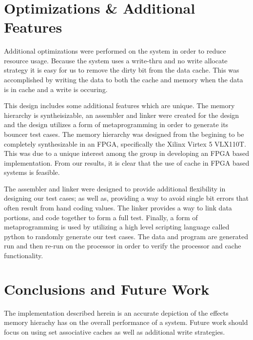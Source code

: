 \documentclass[11pt,letterpaper,]{article}
\begin{document}
\section{ Optimizations \& Additional Features }
\paragraph{}
Additional optimizations were performed on the system in order to reduce resource usage.  Because the system uses a write-thru and no write allocate strategy it is easy for us to remove the dirty bit from the data cache.  This was accomplished by writing the data to both the cache and memory when the data is in cache and a write is occuring.

This design includes some additional features which are unique.  The memory hierarchy is syntheisizable, an assembler and linker were created for the design and the design utilizes a form of metaprogramming in order to generate its bouncer test cases.  The memory hierarchy was designed from the begining to be completely synthesizable in an FPGA, specifically the Xilinx Virtex 5 VLX110T.  This was due to a unique interest among the group in developing an FPGA based implementation.  From our results, it is clear that the use of cache in FPGA based systems is feasible. 

The assembler and linker were designed to provide additional flexibility in designing our test cases; as well as, providing a way to avoid single bit errors that often result from hand coding values.  The linker provides a way to link data portions, and code together to form a full test. Finally, a form of metaprogramming is used by utilizing a high level scripting language called python to randomly generate our test cases.  The data and program are generated run and then re-run on the processor in order to verify the processor and cache functionality.

\section{ Conclusions and Future Work }
\paragraph{}
The implementation described herein is an accurate depiction of the effects memory hierachy has on the overall performance of a system.  Future work should focus on using set associative caches as well as additional write strategies.
\end{document}
